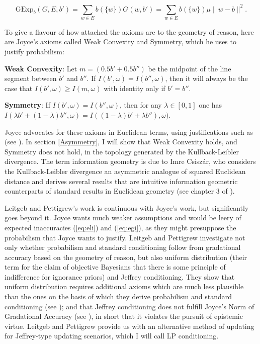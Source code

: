 \documentclass[11pt]{article}
\begin{document}
\begin{equation}
  \label{eq:egi}
  \mbox{GExp}_{b}(G,E,b')=\sum_{w\in{}E}b(\{w\})G(w,b')=\sum_{w\in{}E}b(\{w\})\mu\|w-b\|^{2}.
\end{equation}

To give a flavour of how attached the axioms are to the geometry of
reason, here are Joyce's axioms called Weak Convexity and Symmetry,
which he uses to justify probabilism:

\begin{quotex}
  \textbf{Weak Convexity}: Let $m=(0.5b'+0.5b'')$ be the midpoint of the line
  segment between $b'$ and $b''$. If $I(b',\omega)=I(b'',\omega)$,
  then it will always be the case that $I(b',\omega)\geq{}I(m,\omega)$
  with identity only if $b'=b''$.
\end{quotex}

\begin{quotex}
  \textbf{Symmetry}: If $I(b',\omega)=I(b'',\omega)$, then for any
  $\lambda\in{}[0,1]$ one has\newline
  $I(\lambda{}b'+(1-\lambda)b'',\omega)=I((1-\lambda){}b'+\lambda{}b''),\omega)$.
\end{quotex}

Joyce advocates for these axioms in Euclidean terms, using
justifications such as  (see ). In section \ref{Asymmetry}, I
will show that Weak Convexity holds, and Symmetry does not hold, in
 the topology generated by the
Kullback-Leibler divergence. The term information geometry is due to
Imre Csisz{\'a}r, who considers the Kullback-Leibler divergence an
asymmetric analogue of squared Euclidean distance and derives several
results that are intuitive information geometric counterparts of
standard results in Euclidean geometry (see chapter 3 of
).

Leitgeb and Pettigrew's work is continuous with Joyce's work, but
significantly goes beyond it. Joyce wants much weaker assumptions and
would be leery of expected inaccuracies (\ref{eq:eli}) and
(\ref{eq:egi}), as they might presuppose the probabilism that Joyce
wants to justify. Leitgeb and Pettigrew investigate not only whether
probabilism and standard conditioning follow from gradational accuracy
based on the geometry of reason, but also uniform distribution (their
term for the claim of objective Bayesians that there is some principle
of indifference for ignorance priors) and Jeffrey conditioning. They
show that uniform distribution requires additional axioms which are
much less plausible than the ones on the basis of which they derive
probabilism and standard conditioning (see
); and that Jeffrey conditioning
does not fulfill Joyce's Norm of Gradational Accuracy (see
), in short that it violates the pursuit of
epistemic virtue. Leitgeb and Pettigrew provide us with an alternative
method of updating for Jeffrey-type updating scenarios, which I will
call LP conditioning.
\end{document}
